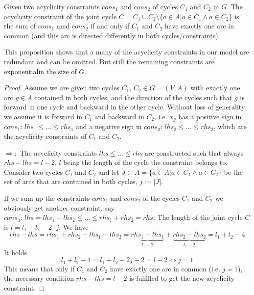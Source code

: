 \begin{prop}
 Given two acyclicity constraints $cons_1$ and $cons_2$ of cycles $C_1$ and $C_2$ in $G$. The acyclicity constraint of 
the joint cycle $C=C_1\cup C_2 \setminus \{a\in A| a\in C_1\land a\in C_2 \}$ is the sum of $cons_1$ amd $cons_2$ if 
and only if $C_1$ and $C_2$ have exactly one arc in common (and this arc is directed differently in both 
cycles/constraints).%
\end{prop}
This proposition shows that a many of the acyclicity constraints in our model are redundant and can be omitted. But 
still the remaining constraints are exponentialin the size of $G$.

\begin{proof}
 Assume we are given two cycles $C_1,\,C_2\in G=(V,A)$ with exactly one arc $g\in A$ 
contained in both cycles, and the direction of the cycles such that $g$ is forward in one cycle and backward in the 
other cycle. Without loss of generality we assume it is forward in $C_1$ and backward in $C_2$, i.e. $x_g$ has a 
positive sign in $cons_1:\,lhs_1\le \dots\le rhs_1$ and a negative sign in $cons_2:\, lhs_2\le \dots\le rhs_2$, which 
are the acyclicity constraints of $C_1$ and $C_2$. 

$\Rightarrow :$ 
The acyclicity constraints $lhs \le \dots\le rhs$ are constructed such that always $rhs-lhs=l-2$, $l$ being the length 
of the cycle the constraint belongs to. Consider two cycles $C_1$ and $C_2$ and let $J\subset A=\{a\in A|a\in C_1 
\land a\in C_2 \}$ be the set of arcs that are contained in both cycles, $j:=|J|$. 

If we sum up the constraints $cons_1$ and $cons_2$ of the cycles $C_1$ and $C_2$ we obviously get another constraint,
say $cons_3:\, lhs=lhs_1+lhs_2\le\dots\le rhs_1+rhs_2=rhs$. The length of the joint cycle $C$ is $l=l_1+l_2-2\cdot j$. 
We have 
$$rhs-lhs=rhs_1+rhs_2-lhs_1-lhs_2=\underbrace{rhs_1-lhs_1}_{l_1-2}+\underbrace{rhs_2-lhs_2}_{l_2-2}=l_1+l_2-4$$
It holds
$$l_1+l_2-4=l_1+l_2-2j-2=l-2 \iff j=1$$ 
This means that only if $C_1$ and $C_2$ have exactly one arc in common (i.e. $j=1$), the necessary condition 
$rhs-lhs=l-2$ is fulfilled to get the new acyclicity constraint.


\end{proof}
